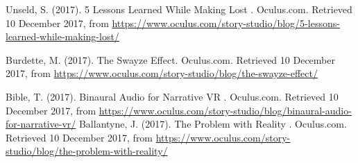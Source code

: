 \documentclass{report}
\begin{document}
				Unseld, S. (2017). 5 Lessons Learned While Making Lost . Oculus.com. Retrieved 10 December 2017, from \href{https://www.oculus.com/story-studio/blog/5-lessons-learned-while-making-lost/}{https://www.oculus.com/story-studio/blog/5-lessons-learned-while-making-lost/}
				
				Burdette, M. (2017). The Swayze Effect. Oculus.com. Retrieved 10 December 2017, from \href{https://www.oculus.com/story-studio/blog/the-swayze-effect/}{https://www.oculus.com/story-studio/blog/the-swayze-effect/}
				
				Bible, T. (2017). Binaural Audio for Narrative VR . Oculus.com. Retrieved 10 December 2017, from \href{https://www.oculus.com/story-studio/blog/binaural-audio-for-narrative-vr/}{https://www.oculus.com/story-studio/blog/binaural-audio-for-narrative-vr/}				
				Ballantyne, J. (2017). The Problem with Reality . Oculus.com. Retrieved 10 December 2017, from \href{https://www.oculus.com/story-studio/blog/the-problem-with-reality/}{https://www.oculus.com/story-studio/blog/the-problem-with-reality/}
				
		
\end{document}
